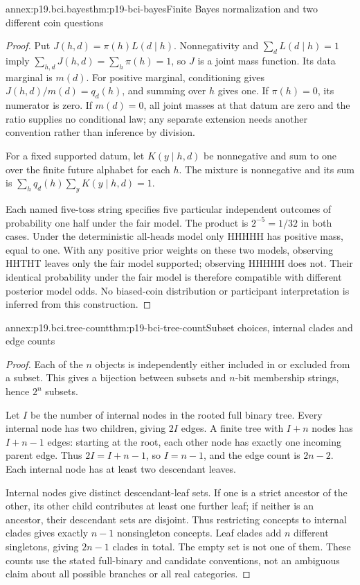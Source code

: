 \begin{annexitem}{annex:p19.bci.bayes}{thm:p19-bci-bayes}{Finite Bayes normalization and two different coin questions}
\begin{proof}
Put \(J(h,d)=\pi(h)L(d\mid h)\). Nonnegativity and
\(\sum_dL(d\mid h)=1\) imply
\(\sum_{h,d}J(h,d)=\sum_h\pi(h)=1\), so \(J\) is a joint
mass function. Its data marginal is \(m(d)\). For positive marginal,
conditioning gives \(J(h,d)/m(d)=q_d(h)\), and summing over \(h\)
gives one. If \(\pi(h)=0\), its numerator is zero. If \(m(d)=0\),
all joint masses at that datum are zero and the ratio supplies no conditional
law; any separate extension needs another convention rather than inference
by division.

For a fixed supported datum, let \(K(y\mid h,d)\) be nonnegative
and sum to one over the finite future alphabet for each \(h\). The
mixture is nonnegative and its sum is
\(\sum_hq_d(h)\sum_yK(y\mid h,d)=1\).

Each named five-toss string specifies five particular independent outcomes
of probability one half under the fair model. The product is \(2^{-5}=1/32\)
in both cases. Under the deterministic all-heads model only HHHHH has
positive mass, equal to one. With any positive prior weights on these
two models, observing HHTHT leaves only the fair model supported; observing
HHHHH does not. Their identical probability under the fair model is
therefore compatible with different posterior model odds. No biased-coin
distribution or participant interpretation is inferred from this construction.
\end{proof}
\end{annexitem}

\begin{annexitem}{annex:p19.bci.tree-count}{thm:p19-bci-tree-count}{Subset choices, internal clades and edge counts}
\begin{proof}
Each of the \(n\) objects is independently either included in or excluded
from a subset. This gives a bijection between subsets and \(n\)-bit
membership strings, hence \(2^n\) subsets.

Let \(I\) be the number of internal nodes in the rooted full binary
tree. Every internal node has two children, giving \(2I\) edges.
A finite tree with \(I+n\) nodes has \(I+n-1\) edges: starting
at the root, each other node has exactly one incoming parent edge.
Thus \(2I=I+n-1\), so \(I=n-1\), and the edge count is
\(2n-2\). Each internal node has at least two descendant leaves.

Internal nodes give distinct descendant-leaf sets. If one is a strict
ancestor of the other, its other child contributes at least one further
leaf; if neither is an ancestor, their descendant sets are disjoint.
Thus restricting concepts to internal clades gives exactly \(n-1\)
nonsingleton concepts. Leaf clades add \(n\) different singletons,
giving \(2n-1\) clades in total. The empty set is not one of them.
These counts use the stated full-binary and candidate conventions, not
an ambiguous claim about all possible branches or all real categories.
\end{proof}
\end{annexitem}

